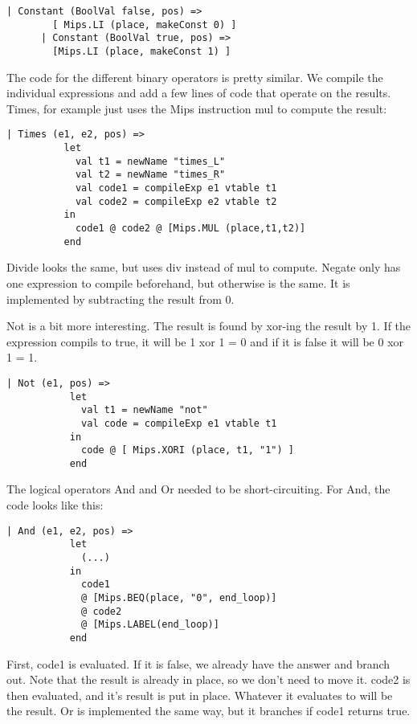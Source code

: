 \documentclass[10pt]{article}
\begin{document}
\begin{Verbatim}[frame=single]
      | Constant (BoolVal false, pos) =>
		[ Mips.LI (place, makeConst 0) ] 
      | Constant (BoolVal true, pos) =>
		[Mips.LI (place, makeConst 1) ] 
\end{Verbatim}

The code for the different binary operators is pretty similar. We compile the individual expressions and add a few lines of code that operate on the results. Times, for example just uses the Mips instruction mul to compute the result:

\begin{Verbatim}[frame=single]
      | Times (e1, e2, pos) =>
          let
            val t1 = newName "times_L"
            val t2 = newName "times_R"
            val code1 = compileExp e1 vtable t1
            val code2 = compileExp e2 vtable t2
          in
            code1 @ code2 @ [Mips.MUL (place,t1,t2)]
          end
\end{Verbatim}

Divide looks the same, but uses div instead of mul to compute. Negate only has one expression to compile beforehand, but otherwise is the same. It is implemented by subtracting the result from 0.

Not is a bit more interesting. The result is found by xor-ing the result by 1. If the expression compils to true, it will be 1 xor 1 = 0 and if it is false it will be 0 xor 1 = 1.

\begin{Verbatim}[frame=single]
       | Not (e1, pos) =>
           let
             val t1 = newName "not"
             val code = compileExp e1 vtable t1
           in
             code @ [ Mips.XORI (place, t1, "1") ]
           end
\end{Verbatim}

The logical operators And and Or needed to be short-circuiting. For And, the code looks like this:

\begin{Verbatim}[frame=single]
       | And (e1, e2, pos) =>
           let
             (...)
           in
             code1
             @ [Mips.BEQ(place, "0", end_loop)]
             @ code2
             @ [Mips.LABEL(end_loop)]
           end
\end{Verbatim}
First, code1 is evaluated. If it is false, we already have the answer and branch out. Note that the result is already in place, so we don't need to move it. code2 is then evaluated, and it's result is put in place. Whatever it evaluates to will be the result. Or is implemented the same way, but it branches if code1 returns true.
\end{document}
